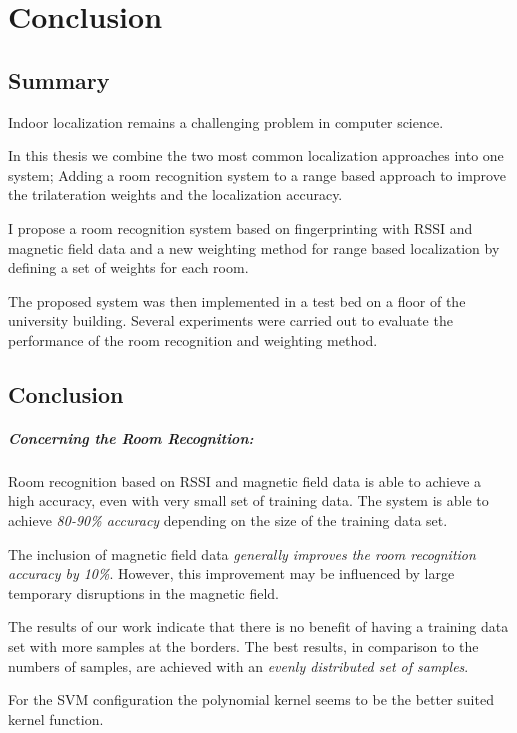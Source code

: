 \chapter{Conclusion}

\label{Chapter6}

\section{Summary}


Indoor localization remains a challenging problem in computer science.

In this thesis we combine the two most common localization approaches into one system; Adding a room recognition system to a range based approach to improve the trilateration weights and the localization accuracy.

I propose a room recognition system based on fingerprinting with RSSI and magnetic field data and a new weighting method for range based localization by defining a set of weights for each room.

The proposed system was then implemented in a test bed on a floor of the university building. Several experiments were carried out to evaluate the performance of the room recognition and weighting method.

\section{Conclusion}

\paragraph{Concerning the Room Recognition:}
Room recognition based on RSSI and magnetic field data is able to achieve a high accuracy, even with very small set of training data. The system is able to achieve \emph{80-90\% accuracy} depending on the size of the training data set.

The inclusion of magnetic field data \emph{generally improves the room recognition accuracy by 10\%}. However, this improvement may be influenced by large temporary disruptions in the magnetic field.

The results of our work indicate that there is no benefit of having a training data set with more samples at the borders. The best results, in comparison to the numbers of samples, are achieved with an \emph{evenly distributed set of samples}.

For the SVM configuration the polynomial kernel seems to be the better suited kernel function.


